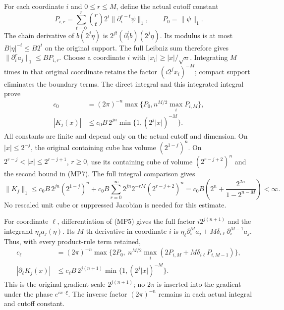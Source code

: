\documentclass[
  11pt,
]{article}
\begin{document}
For each coordinate \(i\) and \(0\leq r\leq M\), define the actual
cutoff constant \[
 P_{i,r}=\sum_{t=0}^r\binom rt2^t
                    \|\partial_i^{r-t}\psi\|_1,\qquad
 P_0=\|\psi\|_1 .
                                                               \tag{MP6}
\] The chain derivative of \(b(2^j\eta)\) is
\(2^{jt}(\partial_i^tb)(2^j\eta)\). Its modulus is at most
\(B|\eta|^{-t}\leq B2^t\) on the original support. The full Leibniz sum
therefore gives \(\|\partial_i^ra_j\|_1\leq BP_{i,r}\). Choose a
coordinate \(i\) with \(|x_i|\geq|x|/\sqrt n\). Integrating \(M\) times
in that original coordinate retains the factor \((i2^jx_i)^{-M}\);
compact support eliminates the boundary terms. The direct integral and
this integrated integral prove \[
 \begin{split}
 c_0&=(2\pi)^{-n}
            \max\{P_0,n^{M/2}\max_iP_{i,M}\},\\
 |K_j(x)|&\leq c_0B\,2^{jn}
                     \min\{1,(2^j|x|)^{-M}\}.
 \end{split}                                                   \tag{MP7}
\] All constants are finite and depend only on the actual cutoff and
dimension. On \(|x|\leq2^{-j}\), the original containing cube has volume
\((2^{1-j})^n\). On \(2^{r-j}<|x|\leq2^{r-j+1}\), \(r\geq0\), use its
containing cube of volume \((2^{r-j+2})^n\) and the second bound in
(MP7). The full integral comparison gives \[
 \|K_j\|_1\leq c_0B\,2^{jn}(2^{1-j})^n
   +c_0B\sum_{r=0}^\infty
       2^{jn}2^{-rM}(2^{r-j+2})^n
 =c_0B\left(2^n+\frac{2^{2n}}{1-2^{n-M}}\right)<\infty .
\] No rescaled unit cube or suppressed Jacobian is needed for this
estimate.

For coordinate \(\ell\), differentiation of (MP5) gives the full factor
\(i2^{j(n+1)}\) and the integrand \(\eta_\ell a_j(\eta)\). Its \(M\)-th
derivative in coordinate \(i\) is
\(\eta_\ell\partial_i^Ma_j+M\delta_{i\ell}\partial_i^{M-1}a_j\). Thus,
with every product-rule term retained, \[
 \begin{split}
 c_\ell&=(2\pi)^{-n}
   \max\{2P_0,\ n^{M/2}\max_i(2P_{i,M}
                           +M\delta_{i\ell}P_{i,M-1})\},\\
 |\partial_\ell K_j(x)|&\leq c_\ell B\,2^{j(n+1)}
                     \min\{1,(2^j|x|)^{-M}\}.
 \end{split}                                                   \tag{MP8}
\] This is the original gradient scale \(2^{j(n+1)}\); no \(2\pi\) is
inserted into the gradient under the phase \(e^{ix\cdot\xi}\). The
inverse factor \((2\pi)^{-n}\) remains in each actual integral and
cutoff constant.
\end{document}
